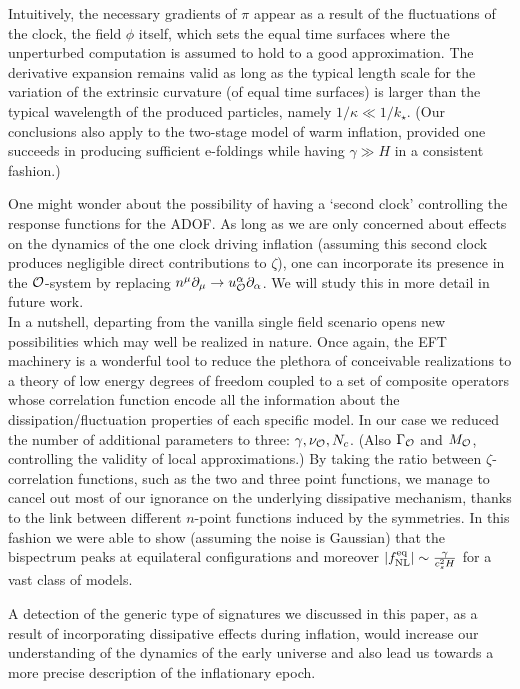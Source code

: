 \documentclass[11pt,amsmath,floats,floatfix,nofootinbib,secnumarabic, superscriptaddress, tightenlines]{revtex4}
\newcommand{\calo}{{\cal O}}
\begin{document}
{Intuitively, the necessary gradients of $\pi$ appear as a result of the fluctuations of the clock, the field $\phi$ itself, which sets the equal time surfaces where the unperturbed computation is assumed to hold to a good approximation. The derivative expansion remains valid as long as the typical length scale for the variation of the extrinsic curvature (of equal time surfaces) is larger than the typical wavelength of the produced particles, namely $1/\kappa \ll 1/k_\star$. (Our conclusions also apply to the two-stage model of warm inflation, provided one succeeds in producing sufficient e-foldings while having $\gamma \gg H$ in a consistent fashion.)

One might wonder about the possibility of having a `second clock' controlling the response functions for the ADOF. As long as we are only concerned about effects on the dynamics of the one clock driving inflation (assuming this second clock produces negligible direct contributions to $\zeta$), one can incorporate its presence in the $\calo$-system by replacing $n^\mu\partial_\mu \to u^\alpha_\calo \partial_\alpha$. We will study this in more detail in future work.\\


In a nutshell, departing from the vanilla single field scenario opens new possibilities which may well be realized in nature. Once again, the EFT machinery is a wonderful tool to reduce the plethora of conceivable realizations to a theory of low energy degrees of freedom coupled to a set of composite operators whose correlation function encode all the information about the dissipation/fluctuation properties of each specific model. In our case we reduced the number of additional parameters to three: $\gamma, \nu_{\calo}, N_c$. (Also $\Gamma_\calo$ and $M_\calo$, controlling the validity of local approximations.) By taking the ratio between $\zeta$-correlation functions, such as the two and three point functions, we manage to cancel out most of our ignorance on the underlying dissipative mechanism, thanks to the link between different $n$-point functions induced by the symmetries. In this fashion we were able to show (assuming the noise is Gaussian) that the bispectrum peaks at equilateral configurations and moreover $|f^{\rm eq}_{\rm NL}| \sim \frac{\gamma}{c_s^2H}$ for a vast class of models. 
 
 A detection of the generic type of signatures we discussed in this paper, as a result of incorporating dissipative effects during inflation, would increase our understanding of the dynamics of the early universe and also lead us towards a more precise description of the inflationary epoch.
 
}
\end{document}
